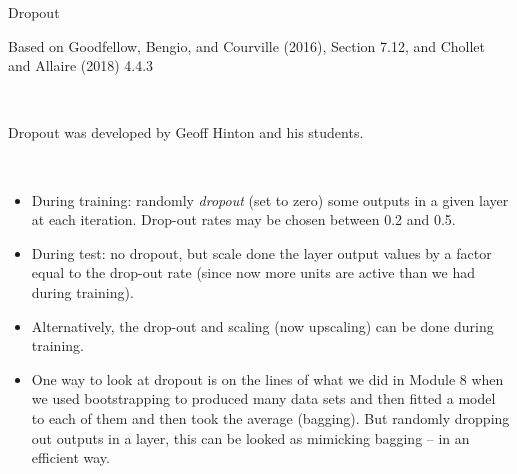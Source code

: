 \documentclass[10pt,ignorenonframetext,]{beamer}
\begin{document}
\begin{frame}

\begin{block}{Dropout}

\tiny

Based on Goodfellow, Bengio, and Courville (2016), Section 7.12, and
Chollet and Allaire (2018) 4.4.3

\normalsize

\(~\)

Dropout was developed by Geoff Hinton and his students.

\(~\)

\begin{itemize}
\item
  During training: randomly \emph{dropout} (set to zero) some outputs in
  a given layer at each iteration. Drop-out rates may be chosen between
  0.2 and 0.5. \vspace{1mm}
\item
  During test: no dropout, but scale done the layer output values by a
  factor equal to the drop-out rate (since now more units are active
  than we had during training). \vspace{1mm}
\item
  Alternatively, the drop-out and scaling (now upscaling) can be done
  during training. \vspace{1mm}
\item
  One way to look at dropout is on the lines of what we did in Module 8
  when we used bootstrapping to produced many data sets and then fitted
  a model to each of them and then took the average (bagging). But
  randomly dropping out outputs in a layer, this can be looked as
  mimicking bagging -- in an efficient way.
\end{itemize}

\end{block}

\end{frame}
\end{document}
